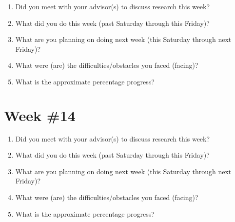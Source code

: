 \documentclass[letterpaper,12pt,fleqn]{article}
\begin{document}
\begin{spacing}{1.50}
  \begin{enumerate}
    \item Did you meet with your advisor(s) to discuss research this week?
          \vfill

    \item What did you do this week (past Saturday through this Friday)? 
          \vfill

    \item What are you planning on doing next week (this Saturday through next Friday)? 
          \vfill

    \item What were (are) the difficulties/obstacles you faced (facing)?
          \vfill

    \item What is the approximate percentage progress?
          \vfill
  \end{enumerate}
\end{spacing}

\clearpage
\section*{Week \#14}

\begin{spacing}{1.50}
  \begin{enumerate}
    \item Did you meet with your advisor(s) to discuss research this week?
          \vfill

    \item What did you do this week (past Saturday through this Friday)? 
          \vfill

    \item What are you planning on doing next week (this Saturday through next Friday)? 
          \vfill

    \item What were (are) the difficulties/obstacles you faced (facing)?
          \vfill

    \item What is the approximate percentage progress?
          \vfill
  \end{enumerate}
\end{spacing}

\end{document}
